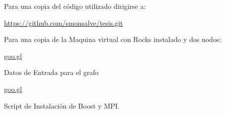 Para una copia del código utilizado dirigirse a: 

\url{https://github.com/smonsalve/tesis.git}

Para una copia de la Maquina virtual con Rocks instalado y dos nodos: 

\url{goo.gl}

Datos de Entrada para el grafo

\url{goo.gl}
		

Script de Instalación de Boost y MPI.

